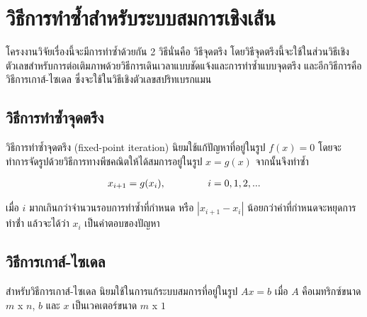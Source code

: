 \section{วิธีการทำซ้ำสำหรับระบบสมการเชิงเส้น}

\hspace{1cm} โครงงานวิจัยเรื่องนี้จะมีการทำซ้ำด้วยกัน 2 วิธีนั่นคือ วิธีจุดตรึง โดยวิธีจุดตรึงนี้จะใช้ในส่วนวิธีเชิงตัวเลขสำหรับการต่อเติมภาพด้วยวิธีการเดินเวลาแบบชัดแจ้งและการทำซ้ำแบบจุดตรึง และอีกวิธีการคือวิธีการเกาส์-ไซเดล ซึ่งจะใช้ในวิธีเชิงตัวเลขสปริทเบรกแมน 

\subsection{วิธีการทำซ้ำจุดตรึง}
\hspace{1cm} วิธีการทำซ้ำจุดตรึง (fixed-point iteration) นิยมใช้แก้ปัญหาที่อยู่ในรูป $f(x) = 0$ โดยจะทำการจัดรูปด้วยวิธีการทางพีชคณิตให้ได้สมการอยู่ในรูป $x = g(x)$ จากนั้นจึงทำซ้ำ

\begin{align*}
    x_{i+1} = g(x_i), \hspace{1.5cm} i=0,1,2,...
\end{align*}

เมื่อ $i$ มากเกินกว่าจำนวนรอบการทำซ้ำที่กำหนด หรือ $|x_{i+1} - x_{i}|$ น้อยกว่าค่าที่กำหนดจะหยุดการทำซ่้ำ แล้วจะได้ว่า $x_i$ เป็นคำตอบของปัญหา


\subsection{วิธีการเกาส์-ไซเดล}
\hspace{1cm} สำหรับวิธีการเกาส์-ไซเดล นิยมใช้ในการแก้ระบบสมการที่อยู่ในรูป $Ax=b$ เมื่อ $A$ คือเมทริกซ์ขนาด $m$ x $n$, $b$ และ $x$ เป็นเวคเตอร์ขนาด $m$ x $1$